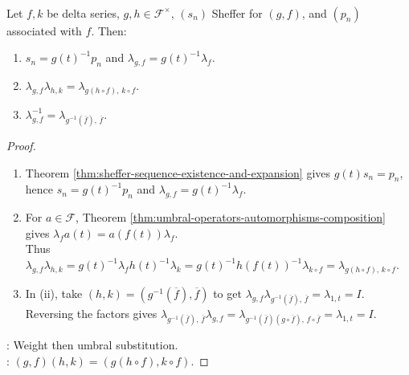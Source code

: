 \begin{proposition} \label{prop:sheffer-operators-group-law} \\
Let $f,k$ be delta series, $g,h\in\mathscr{F}^{\times}$, $(s_n)$ Sheffer for $(g,f)$, and $(p_n)$ associated with $f$. Then:
\begin{enumerate}[label=(\roman*)]
\setlength{\itemsep}{0pt}
\item $s_n=g(t)^{-1}p_n$ and $\lambda_{g,f}=g(t)^{-1}\lambda_f$.
\item $\lambda_{g,f}\lambda_{h,k}=\lambda_{g(h\circ f),\,k\circ f}$.
\item $\lambda_{g,f}^{-1}=\lambda_{g^{-1}(\overline f),\,\overline f}$.
\end{enumerate}
\begin{proof}
\begin{enumerate}[label=(\roman*)]
\setlength{\itemsep}{0pt}
\item Theorem \ref{thm:sheffer-sequence-existence-and-expansion} gives $g(t)s_n=p_n$, hence $s_n=g(t)^{-1}p_n$ and $\lambda_{g,f}=g(t)^{-1}\lambda_f$.
\item For $a\in\mathscr{F}$, Theorem \ref{thm:umbral-operators-automorphisms-composition} gives $\lambda_fa(t)=a(f(t))\lambda_f$.\\
Thus $\lambda_{g,f}\lambda_{h,k}=g(t)^{-1}\lambda_fh(t)^{-1}\lambda_k=g(t)^{-1}h(f(t))^{-1}\lambda_{k\circ f}=\lambda_{g(h\circ f),\,k\circ f}$.
\item In (ii), take $(h,k)=(g^{-1}(\overline f),\overline f)$ to get $\lambda_{g,f}\lambda_{g^{-1}(\overline f),\,\overline f}=\lambda_{1,t}=I$.\\
Reversing the factors gives $\lambda_{g^{-1}(\overline f),\,\overline f}\lambda_{g,f}=\lambda_{g^{-1}(\overline f)(g\circ\overline f),\,f\circ\overline f}=\lambda_{1,t}=I$.
\end{enumerate}
: Weight then umbral substitution.\\
: $(g,f)(h,k)=(g(h\circ f),k\circ f)$.
\end{proof}
\end{proposition}

